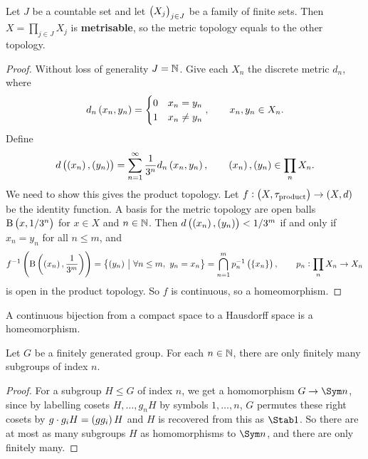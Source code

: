 \begin{proposition}
Let $ J $ be a countable set and let $ \br{X_j}_{j \in J} $ be a family of finite sets. Then $ X = \prod_{j \in J} X_j $ is \textbf{metrisable}, so the metric topology equals to the other topology.
\end{proposition}

\begin{proof}
Without loss of generality $ J = \mathbb{N} $. Give each $ X_n $ the discrete metric $ d_n $, where
$$ d_n\br{x_n, y_n} =
\begin{cases}
0 & x_n = y_n \\
1 & x_n \ne y_n
\end{cases},
\qquad x_n, y_n \in X_n. $$
Define
$$ d\br{\br{x_n}, \br{y_n}} = \sum_{n = 1}^\infty \dfrac{1}{3^n}d_n\br{x_n, y_n}, \qquad \br{x_n}, \br{y_n} \in \prod_n X_n. $$
We need to show this gives the product topology. Let $ f : \br{X, \tau_{\text{product}}} \to \br{X, d} $ be the identity function. A basis for the metric topology are open balls $ \B\br{x, 1 / 3^n} $ for $ x \in X $ and $ n \in \mathbb{N} $. Then $ d\br{\br{x_n}, \br{y_n}} < 1 / 3^m $ if and only if $ x_n = y_n $ for all $ n \le m $, and
$$ f^{-1}\br{\B\br{\br{x_n}, \dfrac{1}{3^m}}} = \cbr{\br{y_n} \st \forall n \le m, \ y_n = x_n} = \bigcap_{n = 1}^m p_n^{-1}\br{\cbr{x_n}}, \qquad p_n : \prod_n X_n \to X_n $$
is open in the product topology. So $ f $ is continuous, so a homeomorphism.
\end{proof}

\begin{proposition}
A continuous bijection from a compact space to a Hausdorff space is a homeomorphism.
\end{proposition}

\begin{lemma}
\label{lem:1.2.18}
Let $ G $ be a finitely generated group. For each $ n \in \mathbb{N} $, there are only finitely many subgroups of index $ n $.
\end{lemma}

\begin{proof}
For a subgroup $ H \le G $ of index $ n $, we get a homomorphism $ G \to \Sym n $, since by labelling cosets $ H, \dots, g_nH $ by symbols $ 1, \dots, n $, $ G $ permutes these right cosets by $ g \cdot g_iH = \br{gg_i}H $ and $ H $ is recovered from this as $ \Stab 1 $. So there are at most as many subgroups $ H $ as homomorphisms to $ \Sym n $, and there are only finitely many.
\end{proof}

